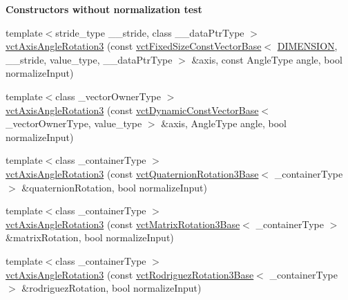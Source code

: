 \begin{Indent}{\bf Constructors without normalization test}
{\begin{DoxyItemize}
\end{DoxyItemize}}\begin{DoxyCompactItemize}
\item 
{\footnotesize template$<$stride\+\_\+type \+\_\+\+\_\+stride, class \+\_\+\+\_\+data\+Ptr\+Type $>$ }\\\hyperlink{classvct_axis_angle_rotation3_a0f6f1bc1932974648c434795c928da93}{vct\+Axis\+Angle\+Rotation3} (const \hyperlink{classvct_fixed_size_const_vector_base}{vct\+Fixed\+Size\+Const\+Vector\+Base}$<$ \hyperlink{group__cisst_vector_gga278b4a98a62e4f5ff42ce055836240a9a778d22dfe29402d2cfdd381c1b870285}{D\+I\+M\+E\+N\+S\+I\+O\+N}, \+\_\+\+\_\+stride, value\+\_\+type, \+\_\+\+\_\+data\+Ptr\+Type $>$ \&axis, const Angle\+Type angle, bool normalize\+Input)
\item 
{\footnotesize template$<$class \+\_\+vector\+Owner\+Type $>$ }\\\hyperlink{classvct_axis_angle_rotation3_ac956d88cd5738814d0a7cc371f2c6a6e}{vct\+Axis\+Angle\+Rotation3} (const \hyperlink{classvct_dynamic_const_vector_base}{vct\+Dynamic\+Const\+Vector\+Base}$<$ \+\_\+vector\+Owner\+Type, value\+\_\+type $>$ \&axis, Angle\+Type angle, bool normalize\+Input)
\item 
{\footnotesize template$<$class \+\_\+container\+Type $>$ }\\\hyperlink{classvct_axis_angle_rotation3_a480f58d5670bfa86156cbc480315289c}{vct\+Axis\+Angle\+Rotation3} (const \hyperlink{classvct_quaternion_rotation3_base}{vct\+Quaternion\+Rotation3\+Base}$<$ \+\_\+container\+Type $>$ \&quaternion\+Rotation, bool normalize\+Input)
\item 
{\footnotesize template$<$class \+\_\+container\+Type $>$ }\\\hyperlink{classvct_axis_angle_rotation3_a95f2a93ec7159be4e2745dc4c1e69d64}{vct\+Axis\+Angle\+Rotation3} (const \hyperlink{classvct_matrix_rotation3_base}{vct\+Matrix\+Rotation3\+Base}$<$ \+\_\+container\+Type $>$ \&matrix\+Rotation, bool normalize\+Input)
\item 
{\footnotesize template$<$class \+\_\+container\+Type $>$ }\\\hyperlink{classvct_axis_angle_rotation3_a13fc3b115bce109caaf269ab41da1dcc}{vct\+Axis\+Angle\+Rotation3} (const \hyperlink{classvct_rodriguez_rotation3_base}{vct\+Rodriguez\+Rotation3\+Base}$<$ \+\_\+container\+Type $>$ \&rodriguez\+Rotation, bool normalize\+Input)
\end{DoxyCompactItemize}
\end{Indent}
